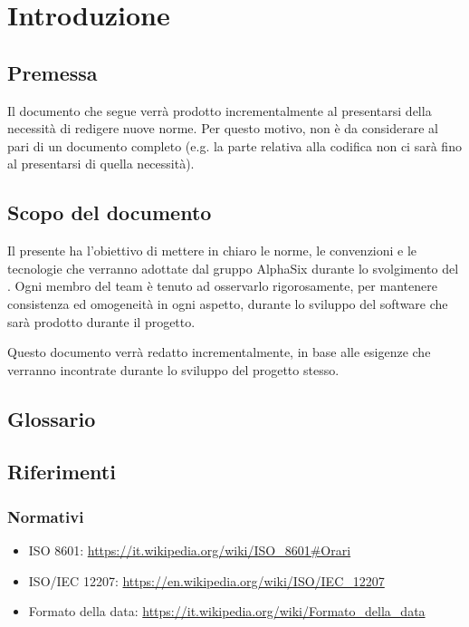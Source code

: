 \section{Introduzione}

\subsection{Premessa}
    Il documento che segue verrà prodotto incrementalmente al presentarsi della necessità di redigere nuove norme.
    Per questo motivo, non è da considerare al pari di un documento completo (e.g. la parte relativa alla codifica non ci sarà fino
    al presentarsi di quella necessità).

\subsection{Scopo del documento}
    Il presente  ha l’obiettivo di mettere in chiaro le norme, le convenzioni e le tecnologie
    che verranno adottate dal gruppo AlphaSix durante lo svolgimento del . Ogni membro del team
    \`e tenuto ad osservarlo rigorosamente, per mantenere consistenza ed omogeneit\`a in ogni aspetto, durante lo sviluppo
    del software che sarà prodotto durante il progetto.\par
    Questo documento verr\`a redatto incrementalmente, in base alle esigenze che verranno incontrate durante lo sviluppo del
    progetto stesso.


\subsection{Glossario}


\subsection{Riferimenti}

    \subsubsection{Normativi}	\label{rifnorma}
    \begin{itemize}
    	\item ISO 8601: \url{https://it.wikipedia.org/wiki/ISO\_8601#Orari}
    	\item ISO/IEC 12207: \url{https://en.wikipedia.org/wiki/ISO/IEC_12207}
    	\item Formato della data: \url{https://it.wikipedia.org/wiki/Formato\_della\_data}
    \end{itemize}

